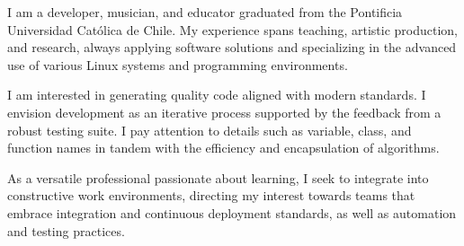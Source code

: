 

\begin{cvparagraph}

    I am a developer, musician, and educator graduated from the Pontificia
    Universidad Católica de Chile. My experience spans teaching, artistic
    production, and research, always applying software solutions and
    specializing in the advanced use of various Linux systems and programming
    environments.

    I am interested in generating quality code aligned with modern standards. I
    envision development as an iterative process supported by the feedback from
    a robust testing suite. I pay attention to details such as variable, class,
    and function names in tandem with the efficiency and encapsulation of
    algorithms.

    As a versatile professional passionate about learning, I seek to integrate
    into constructive work environments, directing my interest towards teams
    that embrace integration and continuous deployment standards, as well as
    automation and testing practices.

\end{cvparagraph}

